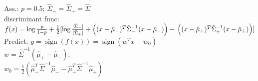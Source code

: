 Ass.: $p = 0.5$; $\hat{\Sigma}_- = \hat{\Sigma}_+ = \hat{\Sigma}$\\
discriminant func:
$f(x) = \operatorname{log} \frac{p}{1-p} + \\
\frac{1}{2}[\operatorname{log} \frac{|\hat{\Sigma}_-|}{|\hat{\Sigma}_+|}
+ \left((x - \hat{\mu}_-)^T \hat{\Sigma}_-^{-1} (x - \hat{\mu}_-)\right) - \\
\left((x - \hat{\mu}_+)^T \hat{\Sigma}_+^{-1} (x - \hat{\mu}_+)\right)]$\\
Predict: $y = \operatorname{sign}(f(x)) = \operatorname{sign} (w^T x + w_0)$\\
$w = \hat{\Sigma}^{-1}(\hat{\mu}_+ - \hat{\mu}_-)$; \\
$w_0 = \frac{1}{2}(\hat{\mu}_-^T\hat{\Sigma}^{-1}\hat{\mu}_- - \hat{\mu}_+^T \hat{\Sigma}^{-1}\hat{\mu}_+)$
